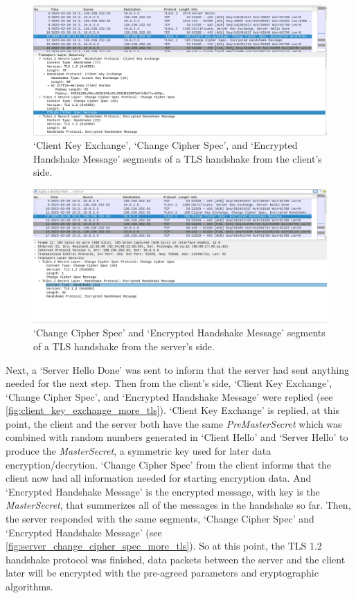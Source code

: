 \begin{figure}
    \centering
    \includegraphics[height=\textheight,width=\textwidth,keepaspectratio]
    {figures/client_key_exchange.png}
    \caption{`Client Key Exchange', `Change Cipher Spec', and `Encrypted Handshake Message'
    segments of a TLS handshake from the client's side.}
    \label{fig:client_key_exchange_more_tls}
\end{figure}

\begin{figure}
    \centering
    \includegraphics[height=\textheight,width=\textwidth,keepaspectratio]
    {figures/server_change_cipher_spec_more.png}
    \caption{`Change Cipher Spec' and `Encrypted Handshake Message' segments of a
    TLS handshake from the server's side.}
    \label{fig:server_change_cipher_spec_more_tls}
\end{figure}

Next, a `Server Hello Done' was sent to inform that the server had sent anything needed
for the next step. Then from the client's side, `Client Key Exchange', `Change Cipher Spec',
and `Encrypted Handshake Message' were replied (see \autoref{fig:client_key_exchange_more_tls}).
`Client Key Exchange' is replied, at this point,
the client and the server both have the same \emph{PreMasterSecret} which was combined with
random numbers generated in `Client Hello' and `Server Hello' to produce the \emph{MasterSecret},
a symmetric key used for later data encryption/decrytion. `Change Cipher Spec' from the client
informs that the client now had all information needed for starting encryption data. And
`Encrypted Handshake Message' is the encrypted message, with key is the \emph{MasterSecret},
that summerizes all of the messages in the handshake so far. Then, the server responded with
the same segments, `Change Cipher Spec' and `Encrypted Handshake Message'
(see \autoref{fig:server_change_cipher_spec_more_tls}). So at this point,
the TLS 1.2 handshake protocol was finished, data packets between the server and the client
later will be encrypted with the pre-agreed parameters and cryptographic algorithms.


